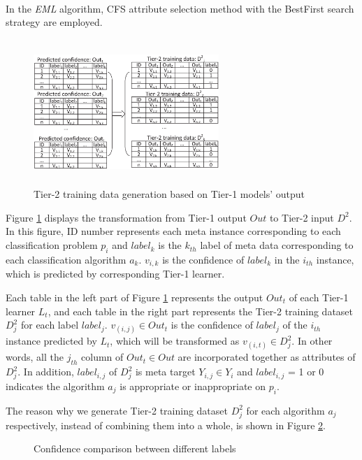 \documentclass[review,3p,twocolumn,times]{elsarticle}
\newcommand{\upcite}[1]{\textsuperscript{\cite{#1}}}
\begin{document}
In the \emph{EML} algorithm, CFS\upcite{Hall1999Correlation} attribute selection method with the BestFirst\upcite{korf1993linear} search strategy are employed.

\begin{figure}[!h]
	\small
	\centering
	\includegraphics[width=7cm, height=5.5cm]{tier-2_data_generation.eps}
	\caption{Tier-2 training data generation based on Tier-1 models' output}
	\label{tier-2_data_generation}
\end{figure}

Figure \ref{tier-2_data_generation} displays the transformation from Tier-1 output $Out$ to Tier-2 input $D^2$. In this figure, ID number represents each meta instance corresponding to each classification problem $p_i$ and $label_k$ is the $k_{th}$ label of meta data corresponding to each classification algorithm $a_k$. $v_{i,k}$ is the confidence of $label_k$ in the $i_{th}$ instance, which is predicted by corresponding Tier-1 learner. 

Each table in the left part of Figure \ref{tier-2_data_generation} represents the output $Out_t$ of each Tier-1 learner $L_t$, and each table in the right part represents the Tier-2 training dataset $D^2_j$ for each label $label_j$. $v_(i,j) \in Out_t$ is the confidence of $label_j$ of the $i_{th}$ instance predicted by $L_t$, which will be transformed as $v_(i,t) \in D^2_j$. In other words, all the $j_{th}$ column of $Out_t \in Out$ are incorporated together as attributes of $D^2_j$. In addition, $label_{i,j}$ of $D^2_j$ is meta target $Y_{i,j} \in Y_i$ and $label_{i,j}$ = 1 or 0 indicates the algorithm $a_j$ is appropriate or inappropriate on $p_i$. 

The reason why we generate Tier-2 training dataset $D^2_j$ for each algorithm $a_j$ respectively, instead of combining them into a whole, is shown in Figure \ref{Confidence comparison}.

\begin{figure}[!h]
	\small
	\centering
	\caption{Confidence comparison between different labels}
	\label{Confidence comparison}
\end{figure} 
\end{document}
